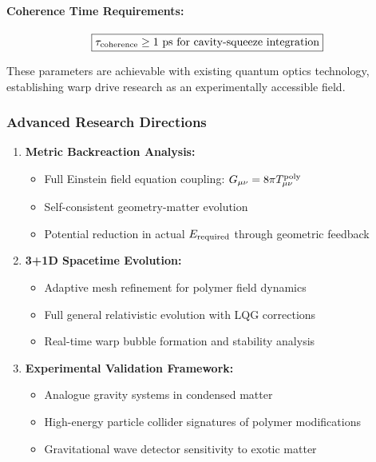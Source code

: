 \documentclass[11pt]{article}
\begin{document}
{\paragraph{Coherence Time Requirements:}
\[
  \boxed{\tau_{\rm coherence} \geq 1\text{ ps for cavity-squeeze integration}}
\]

These parameters are achievable with existing quantum optics technology, establishing warp drive research as an experimentally accessible field.

\subsubsection*{Advanced Research Directions}
\begin{enumerate}
  \item \textbf{Metric Backreaction Analysis:}
        \begin{itemize}
          \item Full Einstein field equation coupling: $G_{\mu\nu} = 8\pi T_{\mu\nu}^{\rm poly}$
          \item Self-consistent geometry-matter evolution
          \item Potential reduction in actual $E_{\rm required}$ through geometric feedback
        \end{itemize}

  \item \textbf{3+1D Spacetime Evolution:}
        \begin{itemize}
          \item Adaptive mesh refinement for polymer field dynamics
          \item Full general relativistic evolution with LQG corrections
          \item Real-time warp bubble formation and stability analysis
        \end{itemize}

  \item \textbf{Experimental Validation Framework:}
        \begin{itemize}
          \item Analogue gravity systems in condensed matter
          \item High-energy particle collider signatures of polymer modifications
          \item Gravitational wave detector sensitivity to exotic matter
        \end{itemize}
\end{enumerate}

}
\end{document}
